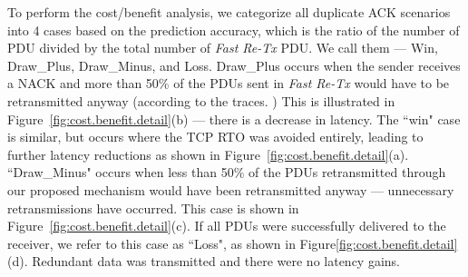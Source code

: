 To perform the cost/benefit analysis, we categorize all duplicate ACK scenarios into 4 cases based on the prediction accuracy, which is the ratio of the number of PDU divided by the total number of \textit{Fast Re-Tx} PDU. We call them --- Win, Draw\_{}Plus, Draw\_{}Minus, and Loss.  Draw\_{}Plus occurs when the sender receives a NACK and more than 50\% of the PDUs sent in \textit{Fast Re-Tx} would have to be retransmitted anyway (according to the traces.
)
This is illustrated in Figure~\ref{fig:cost.benefit.detail}(b) --- there is a decrease in latency.  The ``win" case is similar, but occurs where the TCP RTO was avoided entirely, leading to further latency reductions as shown in Figure~\ref{fig:cost.benefit.detail}(a).  ``Draw\_{}Minus" occurs when less than 50\% of the PDUs retransmitted through our proposed mechanism would have been retransmitted anyway --- unnecessary retransmissions have occurred. This case is shown in Figure~\ref{fig:cost.benefit.detail}(c). If all PDUs were successfully delivered to the receiver, we refer to this case as ``Loss",  as shown in Figure\ref{fig:cost.benefit.detail}(d). Redundant data was transmitted and there were no latency gains.

